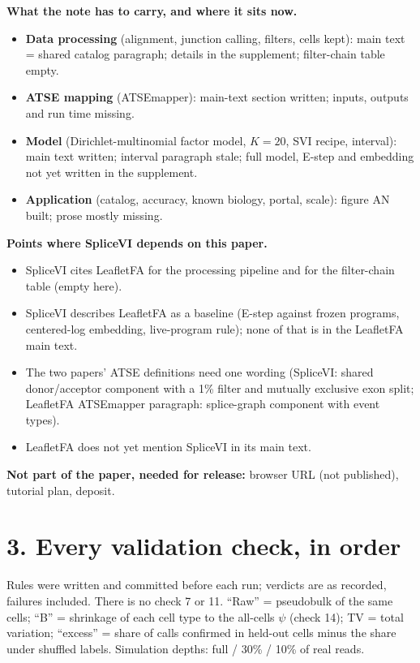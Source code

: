 \documentclass[10pt]{article}
\begin{document}
\textbf{What the note has to carry, and where it sits now.}
\begin{itemize}
  \item \textbf{Data processing} (alignment, junction calling, filters, cells kept): main text = shared catalog paragraph;
    details in the supplement; filter-chain table empty.
  \item \textbf{ATSE mapping} (ATSEmapper): main-text section written; inputs, outputs and run time missing.
  \item \textbf{Model} (Dirichlet-multinomial factor model, $K = 20$, SVI recipe, interval): main text written;
    interval paragraph stale; full model, E-step and embedding not yet written in the supplement.
  \item \textbf{Application} (catalog, accuracy, known biology, portal, scale): figure AN built; prose mostly missing.
\end{itemize}

\textbf{Points where SpliceVI depends on this paper.}
\begin{itemize}
  \item SpliceVI cites LeafletFA for the processing pipeline and for the filter-chain table (empty here).
  \item SpliceVI describes LeafletFA as a baseline (E-step against frozen programs, centered-log embedding, live-program
    rule); none of that is in the LeafletFA main text.
  \item The two papers' ATSE definitions need one wording (SpliceVI: shared donor/acceptor component with a 1\% filter and
    mutually exclusive exon split; LeafletFA ATSEmapper paragraph: splice-graph component with event types).
  \item LeafletFA does not yet mention SpliceVI in its main text.
\end{itemize}

\textbf{Not part of the paper, needed for release:} browser URL (not published), tutorial plan, deposit.

\clearpage
\section*{3. Every validation check, in order}
Rules were written and committed before each run; verdicts are as recorded, failures included. There is no check 7 or 11.
``Raw'' = pseudobulk of the same cells; ``B'' = shrinkage of each cell type to the all-cells $\psi$ (check 14); TV = total
variation; ``excess'' = share of calls confirmed in held-out cells minus the share under shuffled labels. Simulation depths:
full / 30\% / 10\% of real reads.
\end{document}
